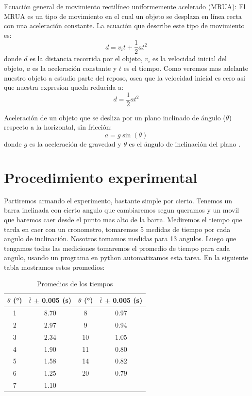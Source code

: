 \documentclass{article}
\begin{document}
Ecuación general de movimiento rectilíneo uniformemente acelerado (MRUA):
El MRUA es un tipo de movimiento en el cual un objeto se desplaza en línea
recta con una aceleración constante. La ecuación que describe este tipo de
movimiento es:
\begin{equation}
d = v_i t + \dfrac{1}{2} a t^2
\end{equation}
donde $d$ es la distancia recorrida por el objeto, $v_i$ es la velocidad
inicial del objeto, $a$ es la aceleración constante y $t$ es el tiempo.
Como veremos mas adelante nuestro objeto a estudio parte del reposo, osea
que la velocidad inicial es cero asi que nuestra expresion queda reducida a:
\begin{equation}
d = \dfrac{1}{2} a t^2
\end{equation}

Aceleración de un objeto que se desliza por un plano inclinado de ángulo 
($\theta$) respecto a la horizontal, sin fricción:
\begin{equation}
a = g \sin(\theta)
\end{equation}
donde $g$ es la aceleración de gravedad y $\theta$ es el ángulo de inclinación
del plano \cite{serway2014physics}.

\section*{Procedimiento experimental}
Partiremos armando el experimento, bastante simple por cierto. Tenemos
un barra inclinada con cierto angulo que cambiaremos segun queramos y 
un movil que haremos caer desde el punto mas alto de la barra. Mediremos
el tiempo que tarda en caer con un cronometro, tomaremos 5 medidas de tiempo
por cada angulo de inclinación. Nosotros tomamos medidas para 13 angulos. 
Luego que tengamos todas las mediciones tomaremos el promedio de tiempo 
para cada angulo, usando un programa en python automatizamos esta tarea.
En la siguiente tabla mostramos estos promedios:

\begin{table}[H]
\centering
\begin{tabular}{|c|c|c|c|}
\hline
$\theta$ (°) & $\bar{t}$ $\pm$ 0.005 (s) & $\theta$ (°) & $\bar{t}$ $\pm$ 0.005 (s) \\
\hline
1 & 8.70 & 8 & 0.97 \\
\hline
2 & 2.97 & 9 & 0.94 \\
\hline
3 & 2.34 & 10 & 1.05 \\
\hline
4 & 1.90 & 11 & 0.80 \\
\hline
5 & 1.58 & 14 & 0.82 \\
\hline
6 & 1.25 & 20 & 0.79 \\
\hline
7 & 1.10 & & \\
\hline
\end{tabular}
\caption{Promedios de los tiempos}
\label{tab:promedios-tiempos}
\end{table}
\end{document}
